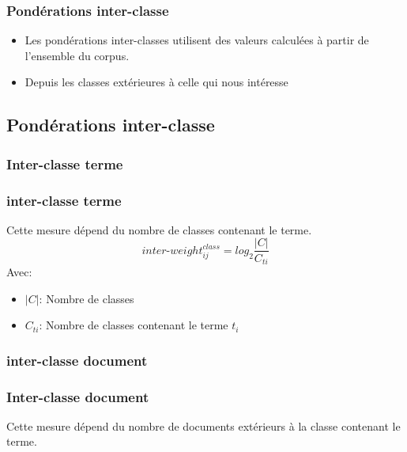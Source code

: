\documentclass[12pt]{beamer}
\begin{document}
\begin{frame}
\frametitle{Pondérations inter-classe}
\begin{itemize}
\item Les pondérations inter-classes utilisent des valeurs calculées à partir de l'ensemble du corpus.

\item Depuis les classes extérieures à celle qui nous intéresse
\end{itemize}
\end{frame}

\begin{frame}
\subsection{Pondérations inter-classe}
\frametitle{Inter-classe terme}
\subsubsection*{inter-classe terme}

Cette mesure dépend du nombre de classes contenant le terme.
\[inter\mbox{-}weight_{ij}^{class} = log_2 \frac{|C|}{C_{ti}}\]
Avec:
\begin{itemize}
	\item $|C|$: Nombre de classes			
	\item $C_{ti}$: Nombre de classes contenant le terme $t_i$
  \end{itemize}
\end{frame}
\begin{frame}
\subsubsection*{inter-classe document}
\frametitle{Inter-classe document}
Cette mesure dépend du nombre de documents extérieurs à la classe contenant le terme.
\end{frame}
\end{document}
